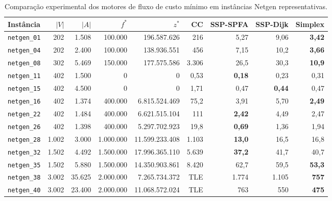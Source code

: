 \begin{table}[!ht]
\centering
\small
\setlength{\tabcolsep}{3.5pt}
\begin{tabular}{lrrrrrrrr}
\toprule
\textbf{Instância} & $|V|$ & $|A|$ & $f^*$ & $z^*$ & \textbf{CC} & \textbf{SSP-SPFA} & \textbf{SSP-Dijk} & \textbf{Simplex} \\
\midrule
\texttt{netgen\_01} & 202 & 1.508 & 100.000 & 196.587.626 & 216 & 5,27 & 9,06 & \textbf{3,42} \\
\texttt{netgen\_04} & 202 & 2.400 & 100.000 & 138.936.551 & 456 & 7,15 & 10,2 & \textbf{3,66} \\
\texttt{netgen\_08} & 302 & 5.469 & 150.000 & 177.575.586 & 3.306 & 26,5 & 30,3 & \textbf{10,9} \\
\texttt{netgen\_11} & 402 & 1.500 & 0 & 0 & 0,53 & \textbf{0,18} & 0,23 & 0,31 \\
\texttt{netgen\_15} & 402 & 4.500 & 0 & 0 & 1,71 & 0,47 & \textbf{0,44} & 0,47 \\
\texttt{netgen\_16} & 402 & 1.374 & 400.000 & 6.815.524.469 & 75,2 & 3,91 & 5,70 & \textbf{2,49} \\
\texttt{netgen\_22} & 402 & 1.484 & 400.000 & 6.621.515.104 & 111 & \textbf{2,42} & 4,49 & 2,47 \\
\texttt{netgen\_26} & 402 & 1.398 & 400.000 & 5.297.702.923 & 19,8 & \textbf{0,69} & 1,36 & 1,94 \\
\texttt{netgen\_28} & 1.002 & 3.000 & 1.000.000 & 11.599.233.408 & 1.103 & \textbf{13,0} & 16,5 & 16,8 \\
\texttt{netgen\_32} & 1.502 & 4.492 & 1.500.000 & 17.996.365.110 & 5.639 & \textbf{37,2} & 41,7 & 40,7 \\
\texttt{netgen\_35} & 1.502 & 5.880 & 1.500.000 & 14.350.903.861 & 8.420 & 62,7 & 59,5 & \textbf{53,3} \\
\texttt{netgen\_38} & 3.002 & 35.625 & 2.000.000 & 7.265.734.372 & TLE & 1.774 & 1.105 & \textbf{757} \\
\texttt{netgen\_40} & 3.002 & 23.400 & 2.000.000 & 11.068.572.024 & TLE & 763 & 550 & \textbf{475} \\
\bottomrule
\end{tabular}
\caption{Comparação experimental dos motores de fluxo de custo mínimo em instâncias Netgen representativas.}
\label{tab:benchmarks_mincost}
\end{table}
